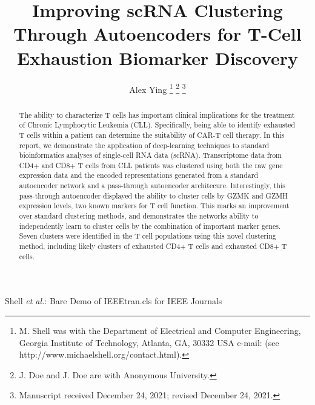 \documentclass[journal]{IEEEtran}
\begin{document}
%
\title{Improving scRNA Clustering Through Autoencoders for T-Cell Exhaustion Biomarker Discovery}
%
%
%

\author{Alex Ying
\thanks{M. Shell was with the Department
of Electrical and Computer Engineering, Georgia Institute of Technology, Atlanta,
GA, 30332 USA e-mail: (see http://www.michaelshell.org/contact.html).}%
\thanks{J. Doe and J. Doe are with Anonymous University.}%
\thanks{Manuscript received December 24, 2021; revised December 24, 2021.}}

%
{Shell \MakeLowercase{\textit{et al.}}: Bare Demo of IEEEtran.cls for IEEE Journals}


\maketitle

\begin{abstract}
The ability to characterize T cells has important clinical implications for the treatment of Chronic Lymphocytic Leukemia (CLL). Specifically, being able to identify exhausted T cells within a patient can determine the suitability of CAR-T cell therapy. 
In this report, we demonstrate the application of deep-learning techniques to standard bioinformatics analyses of single-cell RNA data (scRNA).
Transcriptome data from CD4+ and CD8+ T cells from CLL patients was clustered using both the raw gene expression data and the encoded representations generated from a standard autoencoder network and a pass-through autoencoder architecure. Interestingly, this pass-through autoencoder displayed the ability to cluster cells by GZMK and GZMH expression levels, two known markers for T cell function. This marks an improvement over standard clustering methods, and demonstrates the networks ability to independently learn to cluster cells by the combination of important marker genes.
Seven clusters were identified in the T cell populations using this novel clustering method, including likely clusters of exhausted CD4+ T cells and exhausted CD8+ T cells. 
\end{abstract}
\end{document}
